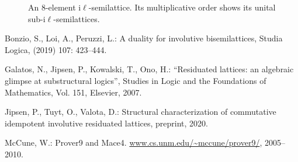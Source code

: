\documentclass[12pt]{amsart}
\begin{document}
\begin{figure}[h!]
  \begin{center}
  \qquad \qquad
\end{center}
  \caption{An 8-element i$\ell$-semilattice. Its multiplicative order shows its unital sub-i$\ell$-semilattices.}
  \label{subsemilattice}
\end{figure}
\clearpage
\begin{thebibliography}{9}
Bonzio, S., Loi, A., Peruzzi, L.: A duality for involutive bisemilattices, Studia Logica, (2019) 107: 423--444.

Galatos, N., Jipsen, P., Kowalski, T., Ono, H.: ``Residuated
lattices: an algebraic glimpse at substructural logics'', Studies
in Logic and the Foundations of Mathematics, Vol. 151, Elsevier, 2007.


Jipsen, P., Tuyt, O., Valota, D.: Structural characterization of commutative idempotent involutive residuated lattices, preprint, 2020.

McCune, W.: Prover9 and Mace4. \url{www.cs.unm.edu/~mccune/prover9/}, 2005–2010.
\end{thebibliography}
\end{document}
